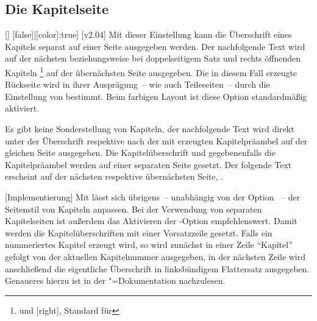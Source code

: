 \subsection{Die Kapitelseite}
\begin{Declaration}{[\PBoolean]}%
  [false][[color]:true]%
\printdeclarationlist%
\label{sec:chapter}%
%
%
%
[v2.04]
Mit dieser Einstellung kann die Überschrift eines Kapitels separat auf einer 
Seite ausgegeben werden. Der nachfolgende Text wird auf der nächsten 
beziehungsweise bei doppelseitigem Satz und rechts öffnenden Kapiteln%
\footnote{%
   und [right], Standard für 
}
auf der übernächsten Seite ausgegeben. Die in diesem Fall erzeugte Rückseite 
wird in ihrer Ausprägung~-- wie auch Teileseiten~-- durch die Einstellung von 
 bestimmt. Beim farbigen Layout ist diese Option 
standardmäßig aktiviert. \notudscrartcl
%
\begin{values}
\itemfalse
  Es gibt keine Sonderstellung von Kapiteln, der nachfolgende Text wird direkt 
  unter der Überschrift respektive nach der mit  
  erzeugten Kapitelpräambel auf der gleichen Seite ausgegeben.
\itemtrue*
  Die Kapitelüberschrift und gegebenenfalls die Kapitelpräambel werden auf 
  einer separaten Seite gesetzt. Der folgende Text erscheint auf der nächsten   
  respektive übernächsten Seite, .
\end{values}
%
[Implementierung]
Mit %
 lässt sich übrigens~-- unabhängig von der Option 
~-- der Seitenstil von Kapiteln anpassen. Bei der 
Verwendung von separaten Kapitelseiten ist außerdem das Aktivieren der 
\KOMAScript-Option  empfehlenswert. Damit werden die
Kapitelüberschriften mit einer Vorsatzzeile gesetzt. Falls ein nummeriertes 
Kapitel erzeugt wird, so wird zunächst in einer Zeile \enquote{Kapitel} gefolgt 
von der aktuellen Kapitelnummer ausgegeben, in der nächsten Zeile wird 
anschließend die eigentliche Überschrift in linksbündigem Flattersatz 
ausgegeben. Genaueres hierzu ist in der \KOMAScript"=Dokumentation 
nachzulesen.
\end{Declaration}


